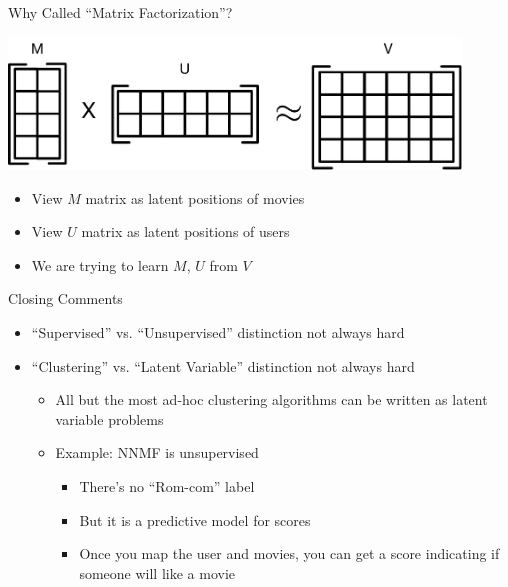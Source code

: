 \documentclass[aspectratio=169]{beamer}
\begin{document}
\begin{frame}{Why Called ``Matrix Factorization''?}

\includegraphics[width=0.9\textwidth]{./lectUL/matrixFactorization.pdf}

\begin{itemize}
\item View $M$ matrix as latent positions of movies
\item View $U$ matrix as latent positions of users
\item We are trying to learn $M$, $U$ from $V$
\end{itemize}

\end{frame}
\begin{frame}{Closing Comments}

\begin{itemize}
\item ``Supervised'' vs. ``Unsupervised'' distinction not always hard
\item ``Clustering'' vs. ``Latent Variable'' distinction not always hard
\begin{itemize}
	\item All but the most ad-hoc clustering algorithms can be written as latent variable problems
	\item Example: NNMF is unsupervised
\begin{itemize}
\item There's no ``Rom-com'' label
\item But it is a predictive model for scores
\item Once you map the user and movies, you can get a score indicating if someone will like a movie
\end{itemize}
\end{itemize}
\end{itemize}
	
\end{frame}
\end{document}
